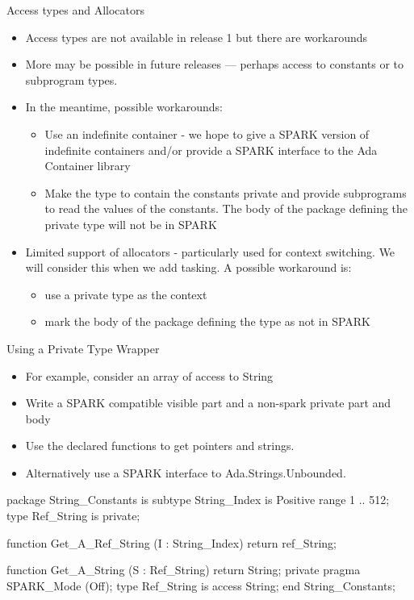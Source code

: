 \documentclass{beamer}
\begin{document}
\begin{frame}{Access types and Allocators}

  \begin{itemize}

  \item Access types are not available in release 1 but there are workarounds
  \item More may be possible in future releases --- perhaps access to constants or to subprogram types. 
  \item In the meantime, possible workarounds:
   \begin{itemize}
    \item Use an indefinite container - we hope to give a SPARK
      version of indefinite containers and/or provide a SPARK
      interface to the Ada Container library
   \item Make the type to contain the constants private and provide
     subprograms to read the values of the constants. The body of the
     package defining the private type will not be in SPARK
  \end{itemize}
  \item Limited support of allocators - particularly used for context
    switching.  We will consider this when we add tasking. A possible
    workaround is:
    \begin{itemize}
    \item use a private type as the context 
    \item mark the body of the package defining the type as not in SPARK
    \end{itemize}
  \end{itemize}

\end{frame}

\begin{frame}[fragile]{Using a Private Type Wrapper}

  \begin{itemize}

    \item For example, consider an array of access to String
    \item Write a SPARK compatible visible part and a non-spark private part and body
    \item Use the declared functions to get pointers and strings.
    \item Alternatively use a SPARK interface to Ada.Strings.Unbounded. 
  \end{itemize}

  \begin{pxcode}[language=SPARK,style=tinystyle,gobble=4]
    package String_Constants
    is
        subtype String_Index is Positive range 1 .. 512;
        type Ref_String is private;

        function Get_A_Ref_String (I : String_Index) return ref_String;

        function Get_A_String (S : Ref_String) return String;
    private
       pragma SPARK_Mode (Off);
       type Ref_String is access String;
    end String_Constants; 
  \end{pxcode}

\end{frame}
\end{document}
